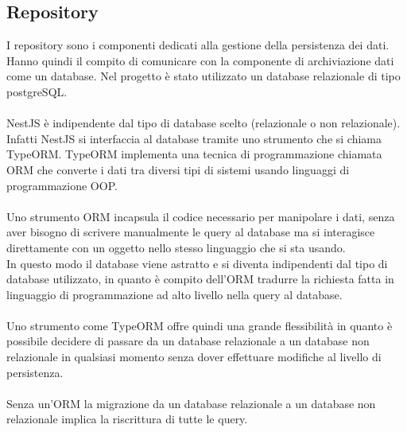 \subsection{Repository}
I repository sono i componenti dedicati alla gestione della persistenza dei dati. Hanno quindi il compito di
comunicare con la componente di archiviazione dati come un database. Nel progetto è stato utilizzato un database
relazionale di tipo postgreSQL.
\\\\
NestJS è indipendente dal tipo di database scelto (relazionale o non relazionale). Infatti NestJS si interfaccia
al database tramite uno strumento che si chiama TypeORM. TypeORM implementa una tecnica di programmazione chiamata 
ORM che converte i dati tra diversi tipi di sistemi usando linguaggi di programmazione OOP.
\\\\
Uno strumento ORM incapsula il codice necessario per manipolare i dati, senza aver bisogno di scrivere manualmente
le query al database ma si interagisce direttamente con un oggetto nello stesso linguaggio che si sta usando. 
\\
In questo modo il database viene astratto e si diventa indipendenti dal tipo di database utilizzato, in quanto è compito dell'ORM
tradurre la richiesta fatta in linguaggio di programmazione ad alto livello nella query al database. 
\\\\
Uno strumento come TypeORM offre quindi una grande flessibilità in quanto è possibile decidere di passare da un database
relazionale a un database non relazionale in qualsiasi momento senza dover effettuare modifiche al livello di persistenza.
\\\\
Senza un'ORM la migrazione da un database relazionale a un database non relazionale implica la riscrittura di tutte le query.
\\\\


